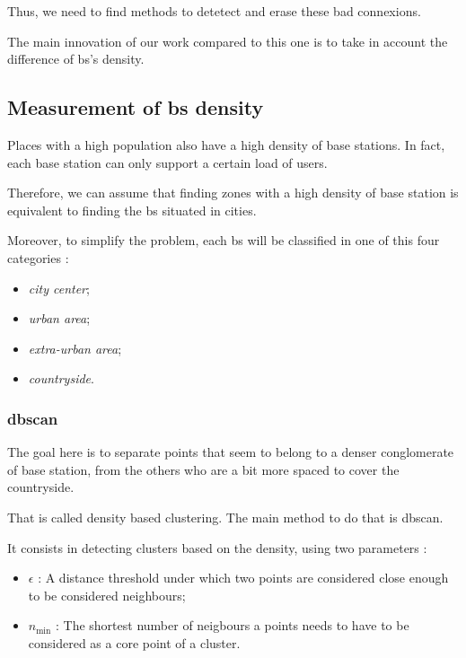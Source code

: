 \documentclass[lettersize,journal,english]{IEEEtran}
\begin{document}
Thus, we need to find methods to detetect and erase these bad connexions.

The main innovation of our work compared to this one \cite{art_del_paq} is to take in account the difference of \acrshort{bs}'s density.

\subsection{Measurement of \acrshort{bs} density}
\noindent Places with a high population also have a high density of base stations. In fact, each base station can only support a certain
load of users.

Therefore, we can assume that finding zones with a high density of base station is equivalent to finding the \acrshort{bs} 
situated in \og cities\fg{}.

Moreover, to simplify the problem, each \acrshort{bs} will be classified in one of this four categories :
\begin{itemize}
    \item \emph{city center};
    \item \emph{urban area};
    \item \emph{extra-urban area};
    \item \emph{countryside}.
\end{itemize}

\subsubsection{\acrshort{dbscan}}
The goal here is to separate points that seem to belong to a denser conglomerate of base station, from the others who are a bit more spaced
to cover the countryside.

That is called density based clustering. The main method to do that is \acrshort{dbscan}.

It consists in detecting clusters based on the density, using two parameters :

\begin{itemize}
    \item \emph{$\epsilon$} : A distance threshold under which two points are considered close enough to be considered neighbours;   
    \item \emph{$n_{\text{min}}$} : The shortest number of neigbours a points needs to have to be considered as a core point of a cluster.
    
\end{itemize}
\end{document}
